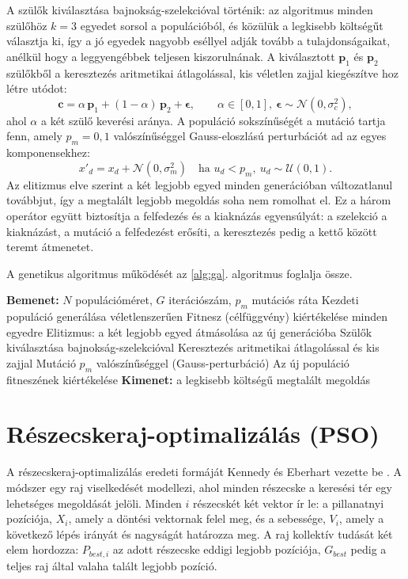 A szülők kiválasztása bajnokság-szelekcióval történik: az algoritmus minden szülőhöz $k=3$ egyedet sorsol a populációból, és közülük a legkisebb költségűt választja ki, így a jó egyedek nagyobb eséllyel adják tovább a tulajdonságaikat, anélkül hogy a leggyengébbek teljesen kiszorulnának. A kiválasztott $\mathbf{p}_1$ és $\mathbf{p}_2$ szülőkből a keresztezés aritmetikai átlagolással, kis véletlen zajjal kiegészítve hoz létre utódot:
\begin{equation}
\mathbf{c} = \alpha \, \mathbf{p}_1 + (1-\alpha)\, \mathbf{p}_2 + \boldsymbol{\epsilon},
\qquad \alpha \in [0,1],\ \boldsymbol{\epsilon}\sim\mathcal{N}(0,\sigma_c^2),
\end{equation}
ahol $\alpha$ a két szülő keverési aránya. A populáció sokszínűségét a mutáció tartja fenn, amely $p_m = 0{,}1$ valószínűséggel Gauss-eloszlású perturbációt ad az egyes komponensekhez:
\begin{equation}
x'_d = x_d + \mathcal{N}(0,\sigma_m^2)\quad\text{ha } u_d < p_m,\ u_d\sim\mathcal{U}(0,1).
\end{equation}
Az elitizmus elve szerint a két legjobb egyed minden generációban változatlanul továbbjut, így a megtalált legjobb megoldás soha nem romolhat el. Ez a három operátor együtt biztosítja a felfedezés és a kiaknázás egyensúlyát: a szelekció a kiaknázást, a mutáció a felfedezést erősíti, a keresztezés pedig a kettő között teremt átmenetet.

A genetikus algoritmus működését az \ref{alg:ga}. algoritmus foglalja össze.
\begin{algorithm}[H]
\caption{Genetikus algoritmus (GA)}
\label{alg:ga}
\begin{algorithmic}[1]
\State \textbf{Bemenet:} $N$ populációméret, $G$ iterációszám, $p_m$ mutációs ráta
\State Kezdeti populáció generálása véletlenszerűen
\State Fitnesz (célfüggvény) kiértékelése minden egyedre
    \State Elitizmus: a két legjobb egyed átmásolása az új generációba
    \State Szülők kiválasztása bajnokság-szelekcióval
    \State Keresztezés aritmetikai átlagolással és kis zajjal
    \State Mutáció $p_m$ valószínűséggel (Gauss-perturbáció)
    \State Az új populáció fitneszének kiértékelése
\EndFor
\State \textbf{Kimenet:} a legkisebb költségű megtalált megoldás
\end{algorithmic}
\end{algorithm}

\section{Részecskeraj-optimalizálás (PSO)}
A részecskeraj-optimalizálás eredeti formáját Kennedy és Eberhart vezette be \cite{KennedyEberhartPSO1995}. A módszer egy raj viselkedését modellezi, ahol minden részecske a keresési tér egy lehetséges megoldását jelöli. Minden $i$ részecskét két vektor ír le: a pillanatnyi pozíciója, $X_i$, amely a döntési vektornak felel meg, és a sebessége, $V_i$, amely a következő lépés irányát és nagyságát határozza meg. A raj kollektív tudását két elem hordozza: $P_{best,i}$ az adott részecske eddigi legjobb pozíciója, $G_{best}$ pedig a teljes raj által valaha talált legjobb pozíció.

